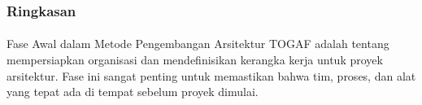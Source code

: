 \documentclass[aspectratio=169, table]{beamer}
\begin{document}
	\begin{frame}
		\frametitle{Ringkasan}
		\framesubtitle{\hspace{1cm}}
		Fase Awal dalam Metode Pengembangan Arsitektur TOGAF adalah tentang mempersiapkan organisasi dan mendefinisikan kerangka kerja untuk proyek arsitektur. Fase ini sangat penting untuk memastikan bahwa tim, proses, dan alat yang tepat ada di tempat sebelum proyek dimulai.
	\end{frame}
	
\end{document}
